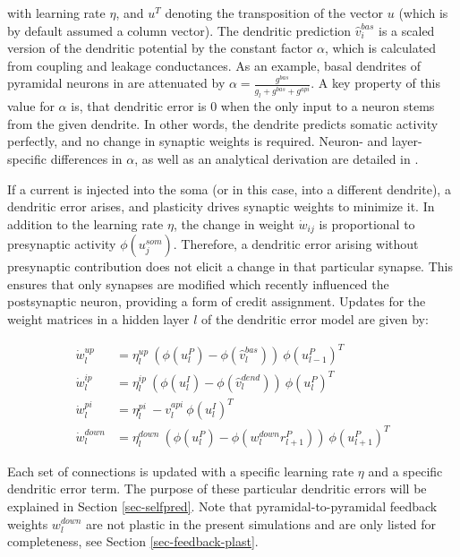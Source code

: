 with learning rate $\eta$, and $u^T$ denoting the transposition of the vector $u$ (which is by default assumed a column
vector). The dendritic prediction $\hat{v}_i^{bas}$ is a scaled version of the dendritic potential by the constant
factor $\alpha$, which is calculated from coupling and leakage conductances. As an example, basal dendrites of pyramidal
neurons in \citep{sacramento2018dendritic} are attenuated by $\alpha = \frac{g^{bas}}{g_l + g^{bas} + g^{api}}$. A key
property of this value for $\alpha$ is, that dendritic error is $0$ when the only input to a neuron stems from the given
dendrite. In other words, the dendrite predicts somatic activity perfectly, and no change in synaptic weights is
required. Neuron- and layer-specific differences in $\alpha$, as well as an analytical derivation are detailed in
\citep{sacramento2018dendritic}.

If a current is injected into the soma (or in this case, into a different dendrite), a dendritic error arises, and
plasticity drives synaptic weights to minimize it. In addition to the learning rate $\eta$, the change in weight
$\dot{w}_{ij}$ is proportional to presynaptic activity $\phi(u_j^{som})$. Therefore, a dendritic error arising without
presynaptic contribution does not elicit a change in that particular synapse. This ensures that only synapses are
modified which recently influenced the postsynaptic neuron, providing a form of credit assignment. Updates for the
weight matrices in a hidden layer $l$ of the dendritic error model are given by:

\begin{align}
  \dot{w}_{l}^{up}   & = \eta_l^{up} \ ( \phi(u_l^{P}) - \phi(\hat{v}_l^{bas}) ) \ \phi(u_{l-1}^{P})^T\label{eq-delta_w_up}         \\
  \dot{w}_{l}^{ip}   & = \eta_l^{ip} \ ( \phi(u_l^{I}) - \phi(\hat{v}_l^{dend}) ) \ \phi(u_{l}^{P})^T\label{eq-delta_w_ip}          \\
  \dot{w}_{l}^{pi}   & = \eta_l^{pi} \ - v_l^{api} \ \phi(u_l^{I})^T\label{eq-delta_w_pi}                                           \\
  \dot{w}_{l}^{down} & = \eta_l^{down} \ ( \phi(u_l^{P}) - \phi(w_l^{down} r_{l+1}^P) )\ \phi(u_{l+1}^{P})^T\label{eq-delta_w_down}
\end{align}

Each set of connections is updated with a specific learning rate $\eta$ and a specific dendritic error term. The purpose
of these particular dendritic errors will be explained in Section \ref{sec-selfpred}. Note that pyramidal-to-pyramidal
feedback weights $w_l^{down}$ are not plastic in the present simulations and are only listed for completeness, see
Section \ref{sec-feedback-plast}.


